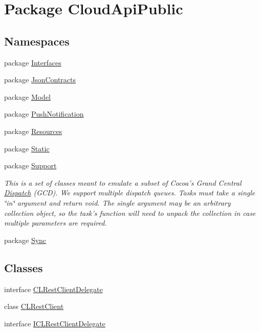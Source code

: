 \hypertarget{namespace_cloud_api_public}{\section{Package Cloud\-Api\-Public}
\label{namespace_cloud_api_public}
}
\subsection*{Namespaces}
\begin{DoxyCompactItemize}
\item 
package \hyperlink{namespace_cloud_api_public_1_1_interfaces}{Interfaces}
\item 
package \hyperlink{namespace_cloud_api_public_1_1_json_contracts}{Json\-Contracts}
\item 
package \hyperlink{namespace_cloud_api_public_1_1_model}{Model}
\item 
package \hyperlink{namespace_cloud_api_public_1_1_push_notification}{Push\-Notification}
\item 
package \hyperlink{namespace_cloud_api_public_1_1_resources}{Resources}
\item 
package \hyperlink{namespace_cloud_api_public_1_1_static}{Static}
\item 
package \hyperlink{namespace_cloud_api_public_1_1_support}{Support}
\begin{DoxyCompactList}\small\item\em This is a set of classes meant to emulate a subset of Cocoa's Grand Central \hyperlink{class_cloud_api_public_1_1_support_1_1_dispatch}{Dispatch} (G\-C\-D). We support multiple dispatch queues. Tasks must take a single \char`\"{}in\char`\"{} argument and return void. The single argument may be an arbitrary collection object, so the task's function will need to unpack the collection in case multiple parameters are required. \end{DoxyCompactList}\item 
package \hyperlink{namespace_cloud_api_public_1_1_sync}{Sync}
\end{DoxyCompactItemize}
\subsection*{Classes}
\begin{DoxyCompactItemize}
\item 
interface \hyperlink{interface_cloud_api_public_1_1_c_l_rest_client_delegate}{C\-L\-Rest\-Client\-Delegate}
\item 
class \hyperlink{class_cloud_api_public_1_1_c_l_rest_client}{C\-L\-Rest\-Client}
\item 
interface \hyperlink{interface_cloud_api_public_1_1_i_c_l_rest_client_delegate}{I\-C\-L\-Rest\-Client\-Delegate}
\end{DoxyCompactItemize}
